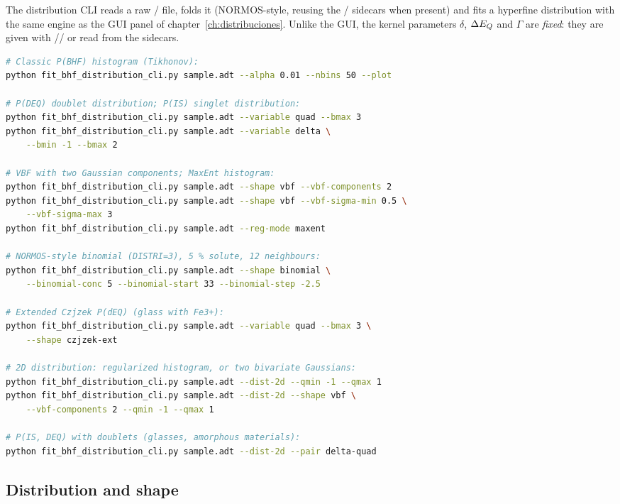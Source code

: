 The distribution CLI reads a raw / file, folds it
(NORMOS-style, reusing the / sidecars when present) and
fits a hyperfine distribution with the same engine as the GUI panel of
chapter~\ref{ch:distribuciones}. Unlike the GUI, the kernel parameters
$\delta$, $\Delta E_{Q}$ and $\Gamma$ are \emph{fixed}: they are given with
// or read from the sidecars.

\begin{lstlisting}[language=bash]
# Classic P(BHF) histogram (Tikhonov):
python fit_bhf_distribution_cli.py sample.adt --alpha 0.01 --nbins 50 --plot

# P(DEQ) doublet distribution; P(IS) singlet distribution:
python fit_bhf_distribution_cli.py sample.adt --variable quad --bmax 3
python fit_bhf_distribution_cli.py sample.adt --variable delta \
    --bmin -1 --bmax 2

# VBF with two Gaussian components; MaxEnt histogram:
python fit_bhf_distribution_cli.py sample.adt --shape vbf --vbf-components 2
python fit_bhf_distribution_cli.py sample.adt --shape vbf --vbf-sigma-min 0.5 \
    --vbf-sigma-max 3
python fit_bhf_distribution_cli.py sample.adt --reg-mode maxent

# NORMOS-style binomial (DISTRI=3), 5 % solute, 12 neighbours:
python fit_bhf_distribution_cli.py sample.adt --shape binomial \
    --binomial-conc 5 --binomial-start 33 --binomial-step -2.5

# Extended Czjzek P(dEQ) (glass with Fe3+):
python fit_bhf_distribution_cli.py sample.adt --variable quad --bmax 3 \
    --shape czjzek-ext

# 2D distribution: regularized histogram, or two bivariate Gaussians:
python fit_bhf_distribution_cli.py sample.adt --dist-2d --qmin -1 --qmax 1
python fit_bhf_distribution_cli.py sample.adt --dist-2d --shape vbf \
    --vbf-components 2 --qmin -1 --qmax 1

# P(IS, DEQ) with doublets (glasses, amorphous materials):
python fit_bhf_distribution_cli.py sample.adt --dist-2d --pair delta-quad
\end{lstlisting}

\subsection{Distribution and shape}

